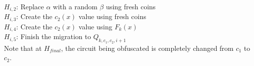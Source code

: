 \noindent $H_{i,2}$: Replace $\alpha$ with a random $\beta$ using fresh coins\\
\noindent $H_{i,3}$: Create the $c_2(x)$ value using fresh coins\\
\noindent $H_{i,4}$: Create the $c_2(x)$ value using $F_k(x)$\\
\noindent $H_{i,5}$: Finish the migration to $Q_{k,c_1,c_2,i+1}$\\

Note that at $H_{final}$, the circuit being obfuscated is completely changed from $c_1$ to $c_2$.



